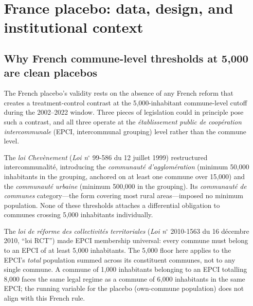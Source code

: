 \documentclass[12pt,letterpaper]{article}
\begin{document}
\newpage
\appendix
\renewcommand{\thesection}{\Alph{section}}
\renewcommand{\thesubsection}{\Alph{section}.\arabic{subsection}}
\renewcommand{\thetable}{A.\arabic{table}}
\renewcommand{\thefigure}{A.\arabic{figure}}
\renewcommand{\theequation}{A.\arabic{equation}}
\setcounter{section}{0}
\setcounter{table}{0}
\setcounter{figure}{0}
\setcounter{equation}{0}

\section{France placebo: data, design, and institutional context}
\label{app:france_data}

\subsection{Why French commune-level thresholds at 5{,}000 are clean placebos}
\label{app:france_institutional}

The French placebo's validity rests on the absence of any French reform that creates a treatment-control contrast at the 5{,}000-inhabitant commune-level cutoff during the 2002--2022 window. Three pieces of legislation could in principle pose such a contrast, and all three operate at the \textit{établissement public de coopération intercommunale} (EPCI, intercommunal grouping) level rather than the commune level.

The \textit{loi Chev\`enement} (\textit{Loi n}$^{\circ}$ 99-586 du 12 juillet 1999) restructured intercommunalit\'e, introducing the \textit{communaut\'e d'agglom\'eration} (minimum 50{,}000 inhabitants in the grouping, anchored on at least one commune over 15{,}000) and the \textit{communaut\'e urbaine} (minimum 500{,}000 in the grouping). Its \textit{communaut\'e de communes} category---the form covering most rural areas---imposed no minimum population. None of these thresholds attaches a differential obligation to communes crossing 5{,}000 inhabitants individually.

The \textit{loi de r\'eforme des collectivit\'es territoriales} (\textit{Loi n}$^{\circ}$ 2010-1563 du 16 d\'ecembre 2010, ``loi RCT'') made EPCI membership universal: every commune must belong to an EPCI of at least 5{,}000 inhabitants. The 5{,}000 floor here applies to the EPCI's \emph{total} population summed across its constituent communes, not to any single commune. A commune of 1{,}000 inhabitants belonging to an EPCI totalling 8{,}000 faces the same legal regime as a commune of 6{,}000 inhabitants in the same EPCI; the running variable for the placebo (own-commune population) does not align with this French rule.
\end{document}
